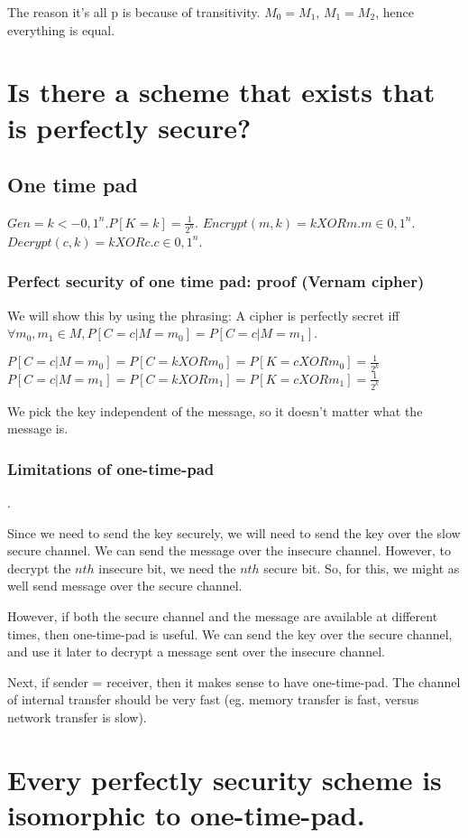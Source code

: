 The reason it's all p is because of transitivity. $M_0 = M_1$, $M_1 = M_2$, hence everything is equal.

\section{Is there a scheme that exists that is perfectly secure?}

\subsection{One time pad}
$Gen = k <- {0, 1}^n. P[K=k] = \frac{1}{2^n}$.
$Encrypt(m, k) = k XOR m. m \in {0, 1}^n$.
$Decrypt(c, k) = k XOR c. c \in {0, 1}^n$.

\subsubsection{Perfect security of one time pad: proof (Vernam cipher)}
We will show this by using the phrasing:
A cipher is perfectly secret iff $\forall m_0, m_1 \in M, P[C=c|M=m_0] = P[C=c|M=m_1]$.

$P[C=c|M=m_0] = P[C=k XOR m_0] = P[K=c XOR m_0] = \frac{1}{2^k}$
$P[C=c|M=m_1] = P[C=k XOR m_1] = P[K=c XOR m_1] = \frac{1}{2^k}$

We pick the key independent of the message, so it doesn't matter what the message is.

\subsubsection{Limitations of one-time-pad}.

Since we need to send the key securely, we will need to send the key over the slow secure channel. We can
send the message over the insecure channel. However, to decrypt the $nth$ insecure bit, we need the $nth$
secure bit. So, for this, we might as well send message over the secure channel.


However, if both the secure channel and the message are available at different times, then one-time-pad is useful.
We can send the key over the secure channel, and use it later to decrypt a message sent over the insecure channel.


Next, if sender = receiver, then it makes sense to have one-time-pad. The channel of internal transfer should be
very fast (eg. memory transfer is fast, versus network transfer is slow).

\section{Every perfectly security scheme is isomorphic to one-time-pad.}
